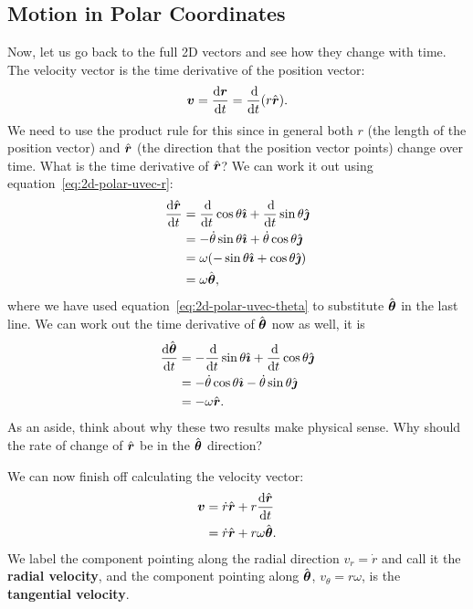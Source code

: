 \documentclass[../classical_mechanics.tex]{subfiles}
\begin{document}
        \subsection{Motion in Polar Coordinates}\label{motion-in-polar-coordinates}
            Now, let us go back to the full 2D vectors and see how they change with time.
            The velocity vector is the time derivative of the position vector:
            \begin{equation}
                \vec{v}=\dv{\vec{r}}{t}=\dv{}{t}(r\uvec{r}).
            \end{equation}
            We need to use the product rule for this since in general both $r$ (the length of the position vector) and $\hat{\boldsymbol{r}}$ (the direction that the position vector points) change over time.
            What is the time derivative of $\hat{\boldsymbol{r}}$?
            We can work it out using equation~\ref{eq:2d-polar-uvec-r}:
            \begin{align}
                \dv{\uvec{r}}{t}&=\dv{}{t}\cos\theta\ihat+\dv{}{t}\sin\theta\jhat\\
                &=-\dot{\theta}\sin\theta\ihat+\dot{\theta}\cos\theta\jhat\\
                &=\omega(-\sin\theta\ihat+\cos\theta\jhat)\\
                &=\omega\uvec{\theta}\label{eq:2d-polar-uvec-r-dot},
            \end{align}
            where we have used equation~\ref{eq:2d-polar-uvec-theta} to substitute $\hat{\boldsymbol{\theta}}$ in the last line.
            We can work out the time derivative of $\hat{\boldsymbol{\theta}}$ now as well, it is
            \begin{align}
                \dv{\uvec{\theta}}{t}&=-\dv{}{t}\sin\theta\ihat+\dv{}{t}\cos\theta\jhat\\
                &=-\dot{\theta}\cos\theta\ihat-\dot{\theta}\sin\theta\jhat\\
                &=-\omega\uvec{r}.\label{eq:2d-polar-uvec-theta-dot}
            \end{align}
            As an aside, think about why these two results make physical sense.
            Why should the rate of change of $\hat{\boldsymbol{r}}$ be in the $\hat{\boldsymbol{\theta}}$ direction?

            We can now finish off calculating the velocity vector:
            \begin{align}
                \vec{v}&=\dot{r}\uvec{r}+r\dv{\uvec{r}}{t}\\
                &=\dot{r}\uvec{r}+r\omega\uvec{\theta}.\label{eq:2d-polar-velocity}
            \end{align}
            We label the component pointing along the radial direction $v_r=\dot{r}$ and call it the \textbf{radial velocity}, and the component pointing along $\hat{\boldsymbol{\theta}}$, $v_\theta=r\omega$, is the \textbf{tangential velocity}. 
            
\end{document}
